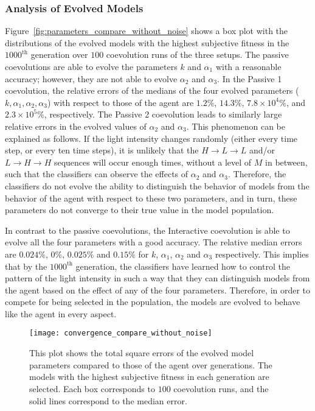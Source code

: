 \subsubsection{Analysis of Evolved Models}\label{sec:analysis_evolved_models_deterministic_interaction}

Figure~\ref{fig:parameters_compare_without_noise} shows a box plot with the distributions of the evolved models with the highest subjective fitness in the $1000^\textrm{th}$ generation over $100$ coevolution runs of the three setups. The passive coevolutions are able to evolve the parameters $k$ and $\alpha_1$ with a reasonable accuracy; however, they are not able to evolve $\alpha_2$ and $\alpha_3$. In the Passive 1 coevolution, the relative errors of the medians of the four evolved parameters ($k,\alpha_1,\alpha_2,\alpha_3$) with respect to those of the agent are $1.2\%$, $14.3\%$, $7.8\times10^4\%$, and $2.3\times10^5\%$, respectively. The Passive 2 coevolution leads to similarly large relative errors in the evolved values of $\alpha_2$ and $\alpha_3$. This phenomenon can be explained as follows. If the light intensity changes randomly (either every time step, or every ten time steps), it is unlikely that the 
$H\rightarrow L\rightarrow L$ and/or $L\rightarrow H\rightarrow H$ sequences 
will occur enough times, without a level of $M$ in between, such that the classifiers can observe the effects of $\alpha_2$ and $\alpha_3$. Therefore, the classifiers do not evolve the ability to distinguish the behavior of models from the behavior of the agent with respect to these two parameters, and in turn, these parameters do not converge to their true value in the model population.

In contrast to the passive coevolutions, the Interactive coevolution is able to evolve all the four parameters with a good accuracy. The relative median errors are $0.024\%$, $0\%$, $0.025\%$ and $0.15\%$ for $k$, $\alpha_1$, $\alpha_2$ and $\alpha_3$ respectively. This implies that by the $1000^{\textrm{th}}$ generation, the classifiers have learned how to control the pattern of the light intensity in such a way that they can distinguish models from the agent based on the effect of any of the four parameters. Therefore, in order to compete for being selected in the population, the models are evolved to behave like the agent in every aspect.

\begin{figure}[!t]%
	    \centering
		\texttt{[image: convergence\_compare\_without\_noise]}
		\caption{This plot shows the total square errors of the evolved model parameters compared to those of the agent over generations. The models with the highest subjective fitness in each generation are selected. Each box corresponds to $100$ coevolution runs, and the solid lines correspond to the median error.\label{fig:convergence_compare}}
\end{figure}


